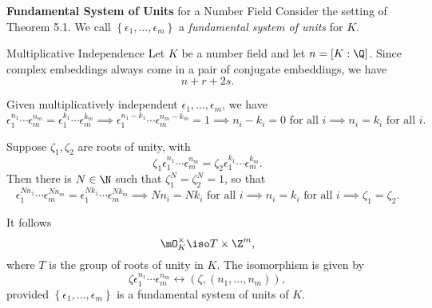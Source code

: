\documentclass[pmath441]{subfiles}
\begin{document}
    \rruleline

    \begin{definition}{\textbf{Fundamental System of Units} for a Number Field}
        Consider the setting of Theorem 5.1. We call $\left\lbrace \epsilon_1,\ldots,\epsilon_m \right\rbrace$ a \emph{fundamental system of units} for $K$.
    \end{definition}
    
    \begin{remark}{Multiplicative Independence}
        Let $K$ be a number field and let $n=\left[ K:\Q \right]$. Since complex embeddings always come in a pair of conjugate embeddings, we have
        \begin{equation*}
            n+r+2s.
        \end{equation*}

        Given multiplicatively independent $\epsilon_1,\ldots,\epsilon_m$, we have
        \begin{equation*}
            \epsilon_1^{n_1}\cdots\epsilon_m^{n_m} = \epsilon_1^{k_1}\cdots\epsilon_m^{k_m} \implies \epsilon_1^{n_1-k_1}\cdots\epsilon_m^{n_m-k_m} = 1 \implies n_i-k_i = 0 \text{ for all $i$} \implies n_i = k_i \text{ for all $i$}.
        \end{equation*}
        
        Suppose $\zeta_1,\zeta_2$ are roots of unity, with
        \begin{equation*}
            \zeta_1\epsilon_1^{n_1}\cdots\epsilon_m^{n_m} =
            \zeta_2\epsilon_1^{k_1}\cdots\epsilon_m^{k_m}.
        \end{equation*}
        Then there is $N\in\N$ such that $\zeta_1^N=\zeta_2^N=1$, so that
        \begin{equation*}
            \epsilon_1^{Nn_1}\cdots\epsilon_m^{Nn_m} = \epsilon_1^{Nk_1}\cdots\epsilon_m^{Nk_m} \implies Nn_i = Nk_i\text{ for all $i$} \implies n_i=k_i\text{ for all $i$} \implies \zeta_1=\zeta_2.
        \end{equation*}

        It follows
        \begin{equation*}
            \mO_K^\times \iso T\times\Z^m,
        \end{equation*}
        where $T$ is the group of roots of unity in $K$. The isomorphism is given by
        \begin{equation*}
            \zeta\epsilon_1^{n_1}\cdots\epsilon_m^{n_m} \leftrightarrow \left( \zeta,\left( n_1,\ldots,n_m \right) \right),
        \end{equation*}
        provided $\left\lbrace \epsilon_1,\ldots,\epsilon_m \right\rbrace$ is a fundamental system of units of $K$.


\end{remark}
\end{document}
